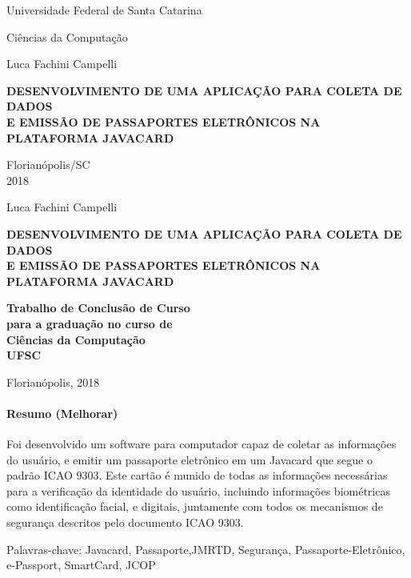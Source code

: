\documentclass{article}
\begin{document}
	\begin{center}

		{\LARGE Universidade Federal de Santa Catarina \par}
		\vspace {2cm}
		
		Ciências da Computação
		\vspace{2cm}

		Luca Fachini Campelli
		\vspace {4cm}

		\textbf{DESENVOLVIMENTO DE UMA APLICAÇÃO PARA COLETA DE DADOS \\
				E EMISSÃO DE PASSAPORTES ELETRÔNICOS NA PLATAFORMA JAVACARD}
		\vspace {10cm}
		
		Florianópolis/SC \\

		2018
	\end{center}

	\newpage
	\begin{center}
		Luca Fachini Campelli
		\vspace{2cm}
		
		\textbf{\large DESENVOLVIMENTO DE UMA APLICAÇÃO PARA COLETA DE DADOS \\
				E EMISSÃO DE PASSAPORTES ELETRÔNICOS NA PLATAFORMA JAVACARD}
		\vspace{2cm}

		\hfill \textbf{Trabalho de Conclusão de Curso \\}
		\hfill \textbf{para a graduação no curso de\\}
		\hfill \textbf{Ciências \hspace{18pt} da \hspace{18pt} Computação \\}
		\hfill \textbf{UFSC  \hspace{60pt}}

		\vspace{1cm}

		\hfill Florianópolis, 2018

	\end{center}

	\newpage

	\paragraph{\large Resumo (Melhorar)}
		\begin{justify}
			\hspace{2cm} Foi desenvolvido um software para computador capaz de coletar as informações do usuário, e emitir um passaporte eletrônico em um Javacard que segue o padrão ICAO 9303. Este cartão é munido de todas as informações necessárias para a verificação da identidade do usuário, incluindo informações biométricas como identificação facial, e digitais, juntamente com todos os mecanismos de segurança descritos pelo documento ICAO 9303.
	
	\vspace*{10px}
Palavras-chave: Javacard, Passaporte,JMRTD, Segurança, Passaporte-Eletrônico, e-Passport, SmartCard, JCOP
		\end{justify}
\end{document}
